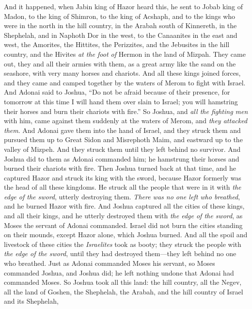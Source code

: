 \begin{biblechapter} %
 And it happened, when Jabin king of Hazor heard this, he sent to Jobab king of Madon, to the king of Shimron, to the king of Acshaph,
\verse and to the kings who were in the north in the hill country, in the Arabah south of Kinnereth, in the Shephelah, and in Naphoth Dor in the west,
\verse to the Canaanites in the east and west, the Amorites, the Hittites, the Perizzites, and the Jebusites in the hill country, and the Hivites \textit{at the foot of} Hermon in the land of Mizpah.
\verse They came out, they and all their armies with them, as a great army like the sand on the seashore, with very many horses and chariots.
\verse And all these kings joined forces, and they came and camped together by the waters of Merom to fight with Israel.
\verse And Adonai said to Joshua, “Do not be afraid because of their presence, for tomorrow at this time I will hand them over slain to Israel; you will hamstring their horses and burn their chariots with fire.”
\verse So Joshua, and \textit{all the fighting men} with him, came against them suddenly at the waters of Merom, and \textit{they attacked them}.
\verse And Adonai gave them into the hand of Israel, and they struck them and pursued them up to Great Sidon and Misrephoth Maim, and eastward up to the valley of Mizpeh. And they struck them until they left behind no survivor.
\verse And Joshua did to them as Adonai commanded him; he hamstrung their horses and burned their chariots with fire.
\verse Then Joshua turned back at that time, and he captured Hazor and struck its king with the sword, because Hazor formerly was the head of all these kingdoms.
\verse He struck all the people that were in it with \textit{the edge of the sword}, utterly destroying them. \textit{There was no one left who breathed}, and he burned Hazor with fire.
\verse And Joshua captured all the cities of these kings, and all their kings, and he utterly destroyed them with \textit{the edge of the sword}, as Moses the servant of Adonai commanded.
\verse Israel did not burn the cities standing on their mounds, except Hazor alone, which Joshua burned.
\verse And all the spoil and livestock of these cities the \textit{Israelites} took as booty; they struck the people with \textit{the edge of the sword}, until they had destroyed them—they left behind no one who breathed.
\verse Just as Adonai commanded Moses his servant, so Moses commanded Joshua, and Joshua did; he left nothing undone that Adonai had commanded Moses.
 So Joshua took all this land: the hill country, all the Negev, all the land of Goshen, the Shephelah, the Arabah, and the hill country of Israel and its Shephelah,

\end{biblechapter}
